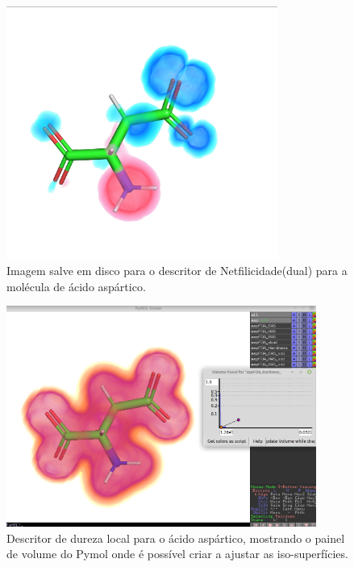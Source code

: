 \documentclass[a4paper,11pt]{refart}
\begin{document}
\hspace*{-\leftmarginwidth}
\begin{minipage}{\fullwidth}
	\begin{figure}[H]
		\begin{center}
			\includegraphics[width=3.5in]{images/tut4_img11}
			\caption{Imagem salve em disco para o descritor de Netfilicidade(dual) para a molécula de ácido aspártico.}
			\label{fig_tut4_9}
		\end{center}
	\end{figure}
\end{minipage}


\hspace*{-\leftmarginwidth}
\begin{minipage}{\fullwidth}
	\begin{figure}[H]
		\begin{center}
			\includegraphics[width=4in]{images/tut4_img13}
			\caption{Descritor de dureza local para o ácido aspártico, mostrando o painel de volume do Pymol onde é possível criar a ajustar as iso-superfícies.}
			\label{fig_tut4_11}
		\end{center}
	\end{figure}
\end{minipage}
\end{document}
